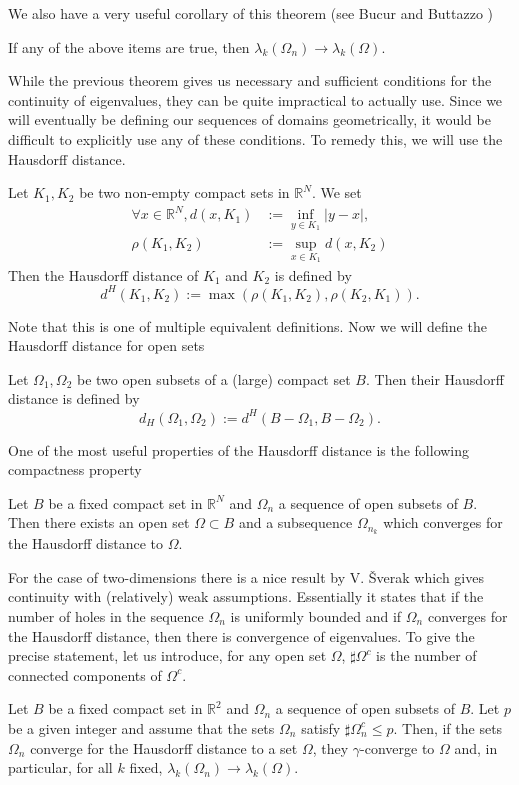We also have a very useful corollary of this theorem (see Bucur and Buttazzo \cite{convergence})
\begin{corollary}
  If any of the above items are true, then $\lambda_{k}(\Omega_{n}) \to \lambda_{k}(\Omega)$.
\end{corollary}
While the previous theorem gives us necessary and sufficient conditions for the continuity of eigenvalues, they can be quite impractical to actually use.
Since we will eventually be defining our sequences of domains geometrically, it would be difficult to explicitly use any of these conditions.
To remedy this, we will use the Hausdorff distance.
\begin{definition}
  Let $K_{1},K_{2}$ be two non-empty compact sets in $\mathbb{R}^{N}$.
  We set 
  \begin{align*}
    \forall x \in \mathbb{R}^{N}, d(x,K_{1}) &:= \inf_{y\in K_{1}} | y - x |, \\
    \rho(K_{1},K_{2}) &:= \sup_{x\in K_{1}} d(x,K_{2})
  \end{align*}
  Then the Hausdorff distance of $K_{1}$ and $K_{2}$ is defined by 
  \[
  d^{H}(K_{1},K_{2}) := \max (\rho(K_{1},K_{2}),\rho(K_{2},K_{1}))
  .\] 
\end{definition}
Note that this is one of multiple equivalent definitions.
Now we will define the Hausdorff distance for open sets
\begin{definition}
  Let $\Omega_{1},\Omega_{2}$ be two open subsets of a (large) compact set $B$.
  Then their Hausdorff distance is defined by 
  \[
  d_{H}(\Omega_{1},\Omega_{2}) := d^{H}(B- \Omega_{1}, B - \Omega_{2})
  .\] 
\end{definition}
One of the most useful properties of the Hausdorff distance is the following compactness property\cite{convergence}
\begin{theorem} \label{comphaus}
  Let $B$ be a fixed compact set in $\mathbb{R}^{N}$ and $\Omega_{n}$ a sequence of open subsets of $B$.
  Then there exists an open set $\Omega \subset B$ and a subsequence $\Omega_{n_{k}}$ which converges for the Hausdorff distance to $\Omega$.
\end{theorem}
For the case of two-dimensions there is a nice result by V. Šverak which gives continuity with (relatively) weak assumptions\cite{sverak}.
Essentially it states that if the number of holes in the sequence $\Omega_{n}$ is uniformly bounded and if $\Omega_{n}$ converges for the Hausdorff distance, then there is convergence of eigenvalues.
To give the precise statement, let us introduce, for any open set $\Omega$, $\sharp \Omega^{c}$ is the number of connected components of $\Omega^{c}$.
\begin{theorem}[Šverak] \label{sverak}
  Let $B$ be a fixed compact set in $\mathbb{R}^{2}$ and $\Omega_{n}$ a sequence of open subsets of $B$.
  Let $p$ be a given integer and assume that the sets $\Omega_{n}$ satisfy $\sharp \Omega_{n}^{c} \leq p$.
  Then, if the sets $\Omega_{n}$ converge for the Hausdorff distance to a set $\Omega$, they $\gamma$-converge to $\Omega$ and, in particular, for all $k$ fixed, $\lambda_{k}(\Omega_{n}) \to \lambda_{k}(\Omega)$.
\end{theorem}

